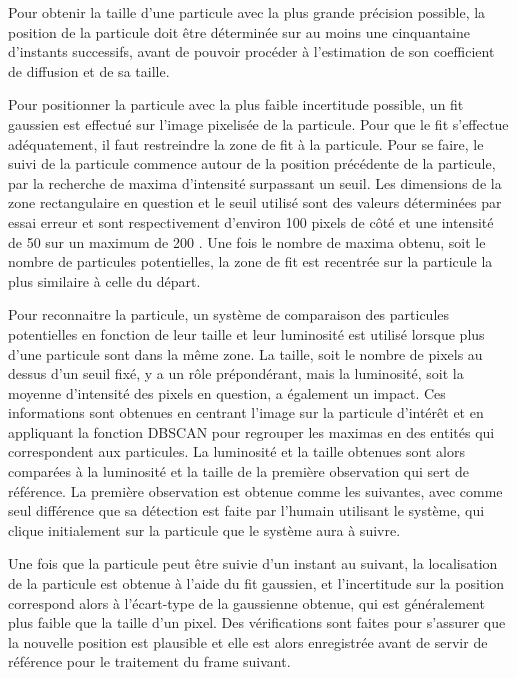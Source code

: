\documentclass[11pt,letterpaper]{article}
\begin{document}
Pour obtenir la taille d'une particule avec la plus grande précision possible, la position de la particule doit être 
déterminée sur au moins une cinquantaine d'instants successifs, avant de pouvoir procéder à l'estimation de son 
coefficient de diffusion et de sa taille. 

Pour positionner la particule avec la plus faible incertitude possible, un 
fit gaussien est effectué sur l'image pixelisée de la particule. Pour que le fit s'effectue
adéquatement, il faut restreindre la zone de fit à la particule. Pour se faire, le suivi de la particule commence 
autour de la position précédente de la particule, par la recherche de maxima d'intensité surpassant un seuil. Les
dimensions de la zone rectangulaire en question et le seuil utilisé sont des valeurs déterminées par essai erreur
et sont respectivement d'environ 100 pixels de côté et une intensité de 50 sur un maximum de 200 .
Une fois le nombre de maxima obtenu, soit le nombre de particules potentielles, la zone de fit est recentrée sur 
la particule la plus similaire à celle du départ.  

Pour reconnaitre la particule, un système de comparaison des particules potentielles en fonction de leur taille 
et leur luminosité est utilisé lorsque plus d'une particule sont dans la même zone. 
La taille, soit le nombre de pixels au dessus d'un seuil fixé, y a un rôle prépondérant, mais la luminosité, soit 
la moyenne d'intensité des pixels en question, a également un impact. Ces informations sont obtenues en centrant 
l'image sur la particule d'intérêt et en appliquant la fonction DBSCAN pour regrouper les maximas en des entités
qui correspondent aux particules. La luminosité et la taille obtenues sont alors comparées à la luminosité et la 
taille de la première observation qui sert de référence. La première observation est obtenue comme les suivantes,
avec comme seul différence que sa détection est faite par l'humain utilisant le système, qui clique initialement 
sur la particule que le système aura à suivre.

Une fois que la particule peut être suivie d'un instant au suivant, la localisation de la particule est obtenue à 
l'aide du fit gaussien, et l'incertitude sur la position correspond alors à l'écart-type de la gaussienne obtenue, 
qui est généralement plus faible que la taille d'un pixel. 
Des vérifications sont faites pour s'assurer que la nouvelle position est plausible et elle est alors
enregistrée avant de servir de référence pour le traitement du frame suivant.
\end{document}
